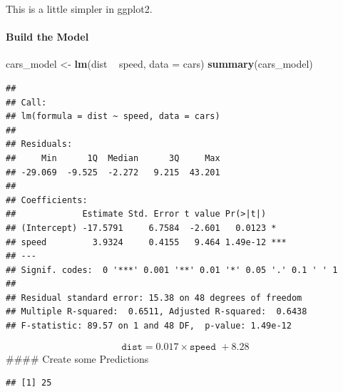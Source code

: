 \documentclass[]{article}
\newenvironment{Shaded}{}{}
\newcommand{\DataTypeTok}[1]{\textcolor[rgb]{0.56,0.13,0.00}{#1}}
\newcommand{\KeywordTok}[1]{\textcolor[rgb]{0.00,0.44,0.13}{\textbf{#1}}}
\newcommand{\NormalTok}[1]{#1}
\newcommand{\OperatorTok}[1]{\textcolor[rgb]{0.40,0.40,0.40}{#1}}
\newcommand{\StringTok}[1]{\textcolor[rgb]{0.25,0.44,0.63}{#1}}
\let\oldparagraph\paragraph
\renewcommand{\paragraph}[1]{\oldparagraph{#1}\mbox{}}
\begin{document}
This is a little simpler in ggplot2.

\hypertarget{build-the-model}{%
\paragraph{Build the Model}\label{build-the-model}}

\begin{Shaded}
\begin{Highlighting}[]
\NormalTok{cars_model <-}\StringTok{ }\KeywordTok{lm}\NormalTok{(dist }\OperatorTok{~}\StringTok{ }\NormalTok{speed, }\DataTypeTok{data =}\NormalTok{ cars)}
\KeywordTok{summary}\NormalTok{(cars_model)}
\end{Highlighting}
\end{Shaded}

\begin{verbatim}
## 
## Call:
## lm(formula = dist ~ speed, data = cars)
## 
## Residuals:
##     Min      1Q  Median      3Q     Max 
## -29.069  -9.525  -2.272   9.215  43.201 
## 
## Coefficients:
##             Estimate Std. Error t value Pr(>|t|)    
## (Intercept) -17.5791     6.7584  -2.601   0.0123 *  
## speed         3.9324     0.4155   9.464 1.49e-12 ***
## ---
## Signif. codes:  0 '***' 0.001 '**' 0.01 '*' 0.05 '.' 0.1 ' ' 1
## 
## Residual standard error: 15.38 on 48 degrees of freedom
## Multiple R-squared:  0.6511, Adjusted R-squared:  0.6438 
## F-statistic: 89.57 on 1 and 48 DF,  p-value: 1.49e-12
\end{verbatim}

\[
\texttt{dist} = 0.017 \times \texttt{speed } + 8.28
\] \#\#\#\# Create some Predictions

\begin{Shaded}
\end{Shaded}

\begin{verbatim}
## [1] 25
\end{verbatim}
\end{document}
